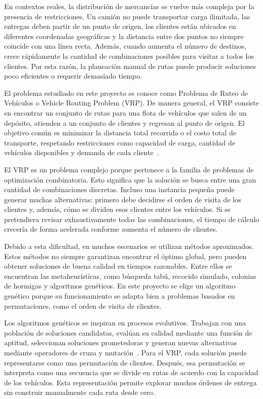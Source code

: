 \documentclass[runningheads]{llncs}
\begin{document}
En contextos reales, la distribuci\'on de mercanc\'ias se vuelve m\'as compleja por
la presencia de restricciones. Un cami\'on no puede transportar carga ilimitada,
las entregas deben partir de un punto de origen, los clientes est\'an ubicados en
diferentes coordenadas geogr\'aficas y la distancia entre dos puntos no siempre
coincide con una l\'inea recta. Adem\'as, cuando aumenta el n\'umero de destinos,
crece r\'apidamente la cantidad de combinaciones posibles para visitar a todos los
clientes. Por esta raz\'on, la planeaci\'on manual de rutas puede producir
soluciones poco eficientes o requerir demasiado tiempo.

El problema estudiado en este proyecto se conoce como Problema de Ruteo de
Veh\'iculos o Vehicle Routing Problem (VRP). De manera general, el VRP consiste
en encontrar un conjunto de rutas para una flota de veh\'iculos que salen de un
dep\'osito, atienden a un conjunto de clientes y regresan al punto de origen. El
objetivo com\'un es minimizar la distancia total recorrida o el costo total de
transporte, respetando restricciones como capacidad de carga, cantidad de
veh\'iculos disponibles y demanda de cada cliente~\cite{toth2014}.

El VRP es un problema complejo porque pertenece a la familia de problemas de
optimizaci\'on combinatoria. Esto significa que la soluci\'on se busca entre una
gran cantidad de combinaciones discretas. Incluso una instancia peque\~na puede
generar muchas alternativas: primero debe decidirse el orden de visita de los
clientes y, adem\'as, c\'omo se dividen esos clientes entre los veh\'iculos. Si se
pretendiera revisar exhaustivamente todas las combinaciones, el tiempo de
c\'alculo crecer\'ia de forma acelerada conforme aumenta el n\'umero de clientes.

Debido a esta dificultad, en muchos escenarios se utilizan m\'etodos
aproximados. Estos m\'etodos no siempre garantizan encontrar el \'optimo global,
pero pueden obtener soluciones de buena calidad en tiempos razonables. Entre
ellos se encuentran las metaheur\'isticas, como b\'usqueda tab\'u, recocido
simulado, colonias de hormigas y algoritmos gen\'eticos. En este proyecto se
elige un algoritmo gen\'etico porque su funcionamiento se adapta bien a problemas
basados en permutaciones, como el orden de visita de clientes.

Los algoritmos gen\'eticos se inspiran en procesos evolutivos. Trabajan con una
poblaci\'on de soluciones candidatas, eval\'uan su calidad mediante una funci\'on
de aptitud, seleccionan soluciones prometedoras y generan nuevas alternativas
mediante operadores de cruza y mutaci\'on~\cite{goldberg1989}. Para el VRP, cada
soluci\'on puede representarse como una permutaci\'on de clientes. Despu\'es, esa
permutaci\'on se interpreta como una secuencia que se divide en rutas de acuerdo
con la capacidad de los veh\'iculos. Esta representaci\'on permite explorar muchos
\'ordenes de entrega sin construir manualmente cada ruta desde cero.
\end{document}
